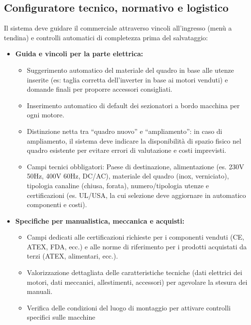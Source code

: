 \subsection{Configuratore tecnico, normativo e logistico}
Il sistema deve guidare il commerciale attraverso vincoli all'ingresso (menù a tendina) e controlli automatici
di completezza prima del salvataggio:
\begin{itemize}
      \item \textbf{Guida e vincoli per la parte elettrica:}
            \begin{itemize}
                  \item Suggerimento automatico del materiale del quadro in base alle utenze inserite (es: taglia corretta
                        dell'inverter in base ai motori venduti) e domande finali per proporre accessori consigliati.
                  \item Inserimento automatico di default dei sezionatori a bordo macchina per ogni motore.
                  \item Distinzione netta tra ``quadro nuovo'' e ``ampliamento'': in caso di ampliamento, il sistema deve
                        indicare la disponibilità di spazio fisico nel quadro esistente per evitare errori di valutazione e costi imprevisti.
                  \item Campi tecnici obbligatori: Paese di destinazione, alimentazione (es. 230V 50Hz, 400V 60Hz, DC/AC),
                        materiale del quadro (inox, verniciato), tipologia canaline (chiusa, forata), numero/tipologia utenze e
                        certificazioni (es. UL/USA, la cui selezione deve aggiornare in automatico componenti e costi).
            \end{itemize}
      \item \textbf{Specifiche per manualistica, meccanica e acquisti:}
            \begin{itemize}
                  \item Campi dedicati alle certificazioni richieste per i componenti venduti (CE, ATEX, FDA, ecc.)
                        e alle norme di riferimento per i prodotti acquistati da terzi (ATEX, alimentari, ecc.).
                  \item Valorizzazione dettagliata delle caratteristiche tecniche (dati elettrici dei motori, dati
                        meccanici, allestimenti, accessori) per agevolare la stesura dei manuali.
                  \item Verifica delle condizioni del luogo di montaggio per attivare controlli specifici sulle macchine

\end{itemize}
\end{itemize}
